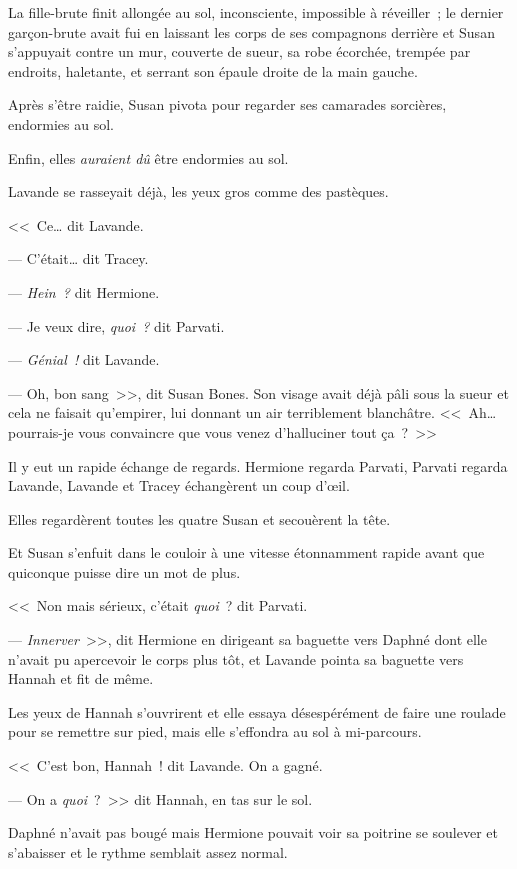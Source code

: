 La fille-brute finit allongée au sol, inconsciente, impossible à réveiller~; le dernier garçon-brute avait fui en laissant les corps de ses compagnons derrière et Susan s'appuyait contre un mur, couverte de sueur, sa robe écorchée, trempée par endroits, haletante, et serrant son épaule droite de la main gauche.

Après s'être raidie, Susan pivota pour regarder ses camarades sorcières, endormies au sol.

Enfin, elles \emph{auraient dû} être endormies au sol.

Lavande se rasseyait déjà, les yeux gros comme des pastèques.

<<~Ce… dit Lavande.

--- C'était… dit Tracey.

--- \emph{Hein~?} dit Hermione.

--- Je veux dire, \emph{quoi~?} dit Parvati.

--- \emph{Génial~!} dit Lavande.

--- Oh, bon sang~>>, dit Susan Bones. Son visage avait déjà pâli sous la sueur et cela ne faisait qu'empirer, lui donnant un air terriblement blanchâtre. <<~Ah… pourrais-je vous convaincre que vous venez d'halluciner tout ça~?~>>

Il y eut un rapide échange de regards. Hermione regarda Parvati, Parvati regarda Lavande, Lavande et Tracey échangèrent un coup d'œil.

Elles regardèrent toutes les quatre Susan et secouèrent la tête.

Et Susan s'enfuit dans le couloir à une vitesse étonnamment rapide avant que quiconque puisse dire un mot de plus.

<<~Non mais sérieux, c'était \emph{quoi}~? dit Parvati.

--- \emph{Innerver}~>>, dit Hermione en dirigeant sa baguette vers Daphné dont elle n'avait pu apercevoir le corps plus tôt, et Lavande pointa sa baguette vers Hannah et fit de même.

Les yeux de Hannah s'ouvrirent et elle essaya désespérément de faire une roulade pour se remettre sur pied, mais elle s'effondra au sol à mi-parcours.

<<~C'est bon, Hannah~! dit Lavande. On a gagné.

--- On a \emph{quoi}~?~>> dit Hannah, en tas sur le sol.

Daphné n'avait pas bougé mais Hermione pouvait voir sa poitrine se soulever et s'abaisser et le rythme semblait assez normal.

